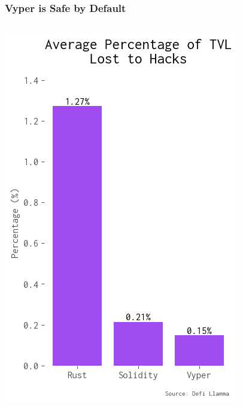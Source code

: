 \documentclass[aspectratio=169]{beamer}
\begin{document}
\begin{frame}
	\frametitle{Vyper is Safe by Default}
	\begin{columns}[T,totalwidth=\textwidth]
		\begin{column}{0.35\textwidth}
			\vspace{2em} %
			\includegraphics[width=\columnwidth,height=0.75\paperheight,keepaspectratio]{charts/security.png}
		\end{column}
		\begin{column}{0.65\textwidth}
			\vspace{2em} %

\end{column}
\end{columns}
\end{frame}
\end{document}
